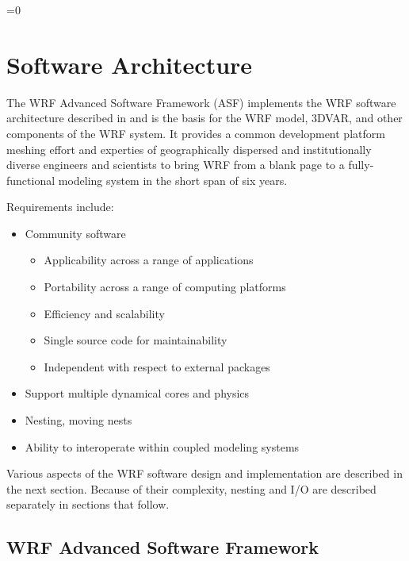 =0
%
\chapter{Software Architecture}
\label{asf_chap}

The WRF Advanced Software Framework (ASF) implements the WRF software
architecture described in \citet{michalak99} and is the basis for the
WRF model, 3DVAR, and other components of the WRF system.  It provides
a common development platform meshing effort and experties of
geographically dispersed and institutionally diverse engineers and
scientists to bring WRF from a blank page to a fully-functional
modeling system in the short span of six years. 

Requirements include:

\begin{itemize}\setlength{\parskip}{-4pt}
  \item Community software
  \begin {itemize}
     \item Applicability across a range of applications
     \item Portability across a range of computing platforms
     \item Efficiency and scalability
     \item Single source code for maintainability
     \item Independent with respect to external packages
  \end {itemize}
  \item Support multiple dynamical cores and physics
  \item Nesting, moving nests
  \item Ability to interoperate within coupled modeling systems
\end{itemize}

\noindent
Various aspects of the WRF software design and implementation are
described in the next section. Because of their complexity, nesting and
I/O are described separately in sections that follow.


\section{WRF Advanced Software Framework}

